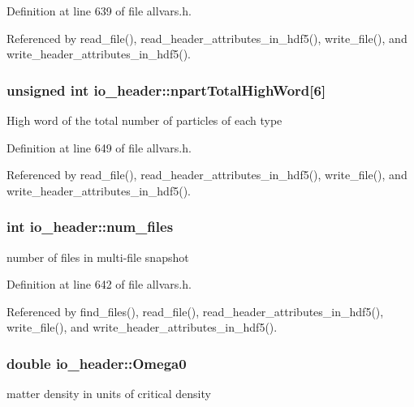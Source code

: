 Definition at line 639 of file allvars.h.



Referenced by read\_\-file(), read\_\-header\_\-attributes\_\-in\_\-hdf5(), write\_\-file(), and write\_\-header\_\-attributes\_\-in\_\-hdf5().

\hypertarget{structio__header_a56f54a68fe289b19902b3c4c561a7159}{
\subsubsection[{npartTotalHighWord}]{\setlength{\rightskip}{0pt plus 5cm}unsigned int {\bf io\_\-header::npartTotalHighWord}\mbox{[}6\mbox{]}}}
\label{structio__header_a56f54a68fe289b19902b3c4c561a7159}
High word of the total number of particles of each type 

Definition at line 649 of file allvars.h.



Referenced by read\_\-file(), read\_\-header\_\-attributes\_\-in\_\-hdf5(), write\_\-file(), and write\_\-header\_\-attributes\_\-in\_\-hdf5().

\hypertarget{structio__header_a5688351781a2845beb2c52a035cc5f71}{
\subsubsection[{num\_\-files}]{\setlength{\rightskip}{0pt plus 5cm}int {\bf io\_\-header::num\_\-files}}}
\label{structio__header_a5688351781a2845beb2c52a035cc5f71}
number of files in multi-\/file snapshot 

Definition at line 642 of file allvars.h.



Referenced by find\_\-files(), read\_\-file(), read\_\-header\_\-attributes\_\-in\_\-hdf5(), write\_\-file(), and write\_\-header\_\-attributes\_\-in\_\-hdf5().

\hypertarget{structio__header_af0d78ac0e8131523be64b3686aab9550}{
\subsubsection[{Omega0}]{\setlength{\rightskip}{0pt plus 5cm}double {\bf io\_\-header::Omega0}}}
\label{structio__header_af0d78ac0e8131523be64b3686aab9550}
matter density in units of critical density 

